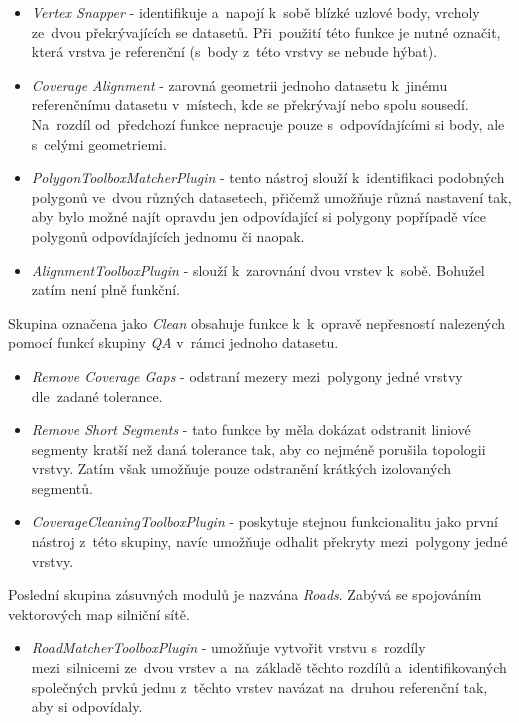 \begin{itemize}[leftmargin=*]
 \item \textit{Vertex Snapper} - identifikuje a~napojí k~sobě blízké uzlové
    body, vrcholy ze~dvou překrývajících se datasetů. Při~použití této funkce
    je nutné označit, která vrstva je referenční (s~body z~této vrstvy se 
    nebude hýbat).
 \item \textit{Coverage Alignment} - zarovná geometrii jednoho datasetu 
    k~jinému referenčnímu datasetu v~místech, kde se překrývají nebo spolu
    sousedí. Na~rozdíl od~předchozí funkce nepracuje pouze s~odpovídajícími
    si body, ale s~celými geometriemi.
 \item \textit{PolygonToolboxMatcherPlugin} - tento nástroj slouží k~identifikaci
    podobných polygonů ve~dvou různých datasetech, přičemž umožňuje různá 
    nastavení tak, aby bylo možné najít opravdu jen odpovídající si polygony
    popřípadě více polygonů odpovídajících jednomu či naopak. %
 \item \textit{AlignmentToolboxPlugin} - slouží k~zarovnání dvou vrstev k~sobě.
    Bohužel zatím není plně funkční. %
\end{itemize}

Skupina označena jako \textit{Clean} obsahuje funkce k~k~opravě nepřesností
nalezených pomocí funkcí skupiny \textit{QA} v~rámci jednoho datasetu.

\begin{itemize}[leftmargin=*]
 \item \textit{Remove Coverage Gaps} - odstraní mezery mezi~polygony jedné
    vrstvy dle~zadané tolerance.
 \item \textit{Remove Short Segments} - tato funkce by měla dokázat odstranit
    liniové segmenty kratší než daná tolerance tak, aby co nejméně porušila 
    topologii vrstvy. Zatím však umožňuje pouze odstranění krátkých izolovaných
    segmentů.
 \item \textit{CoverageCleaningToolboxPlugin} - poskytuje stejnou funkcionalitu
    jako první nástroj z~této skupiny, navíc umožňuje odhalit překryty 
    mezi~polygony jedné vrstvy.
\end{itemize}

Poslední skupina zásuvných modulů je nazvána \textit{Roads}. Zabývá se 
spojováním vektorových map silniční sítě.

\begin{itemize}[leftmargin=*]
 \item \textit{RoadMatcherToolboxPlugin} - umožňuje vytvořit vrstvu s~rozdíly
    mezi~silnicemi ze~dvou vrstev a~na~základě těchto rozdílů a~identifikovaných
    společných prvků jednu z~těchto vrstev navázat na~druhou referenční tak, 
    aby si odpovídaly.
\end{itemize}


